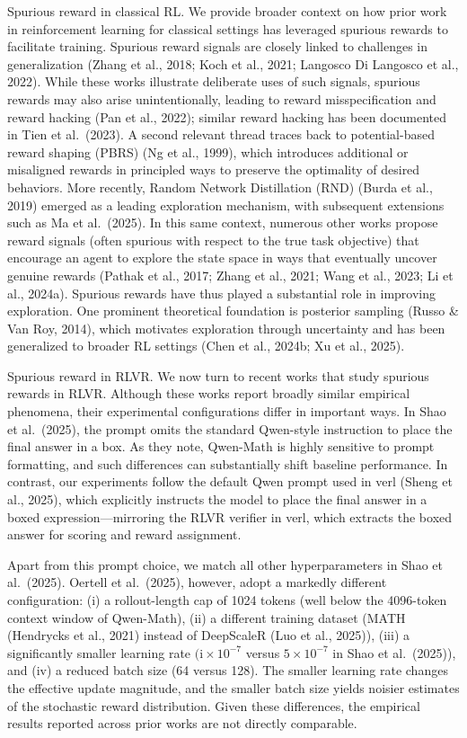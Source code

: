 \documentclass[
  10
]{article}
\begin{document}
Spurious reward in classical RL. We provide broader context on how prior
work in reinforcement learning for classical settings has leveraged
spurious rewards to facilitate training. Spurious reward signals are
closely linked to challenges in generalization (Zhang et al., 2018; Koch
et al., 2021; Langosco Di Langosco et al., 2022). While these works
illustrate deliberate uses of such signals, spurious rewards may also
arise unintentionally, leading to reward misspecification and reward
hacking (Pan et al., 2022); similar reward hacking has been documented
in Tien et al.~(2023). A second relevant thread traces back to
potential-based reward shaping (PBRS) (Ng et al., 1999), which
introduces additional or misaligned rewards in principled ways to
preserve the optimality of desired behaviors. More recently, Random
Network Distillation (RND) (Burda et al., 2019) emerged as a leading
exploration mechanism, with subsequent extensions such as Ma et
al.~(2025). In this same context, numerous other works propose reward
signals (often spurious with respect to the true task objective) that
encourage an agent to explore the state space in ways that eventually
uncover genuine rewards (Pathak et al., 2017; Zhang et al., 2021; Wang
et al., 2023; Li et al., 2024a). Spurious rewards have thus played a
substantial role in improving exploration. One prominent theoretical
foundation is posterior sampling (Russo \& Van Roy, 2014), which
motivates exploration through uncertainty and has been generalized to
broader RL settings (Chen et al., 2024b; Xu et al., 2025).

Spurious reward in RLVR. We now turn to recent works that study spurious
rewards in RLVR. Although these works report broadly similar empirical
phenomena, their experimental configurations differ in important ways.
In Shao et al.~(2025), the prompt omits the standard Qwen-style
instruction to place the final answer in a box. As they note, Qwen-Math
is highly sensitive to prompt formatting, and such differences can
substantially shift baseline performance. In contrast, our experiments
follow the default Qwen prompt used in verl (Sheng et al., 2025), which
explicitly instructs the model to place the final answer in a boxed
expression---mirroring the RLVR verifier in verl, which extracts the
boxed answer for scoring and reward assignment.

Apart from this prompt choice, we match all other hyperparameters in
Shao et al.~(2025). Oertell et al.~(2025), however, adopt a markedly
different configuration: (i) a rollout-length cap of 1024 tokens (well
below the 4096-token context window of Qwen-Math), (ii) a different
training dataset (MATH (Hendrycks et al., 2021) instead of DeepScaleR
(Luo et al., 2025)), (iii) a significantly smaller learning rate
\(( \mathrm { i } \times 1 0 ^ { - 7 }\) versus
\(5 \times 1 0 ^ { - 7 }\) in Shao et al.~(2025)), and (iv) a reduced
batch size (64 versus 128). The smaller learning rate changes the
effective update magnitude, and the smaller batch size yields noisier
estimates of the stochastic reward distribution. Given these
differences, the empirical results reported across prior works are not
directly comparable.
\end{document}
